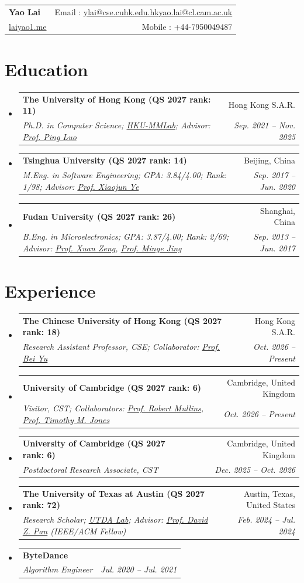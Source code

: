 \documentclass{article}
\makeatletter
\newcommand{\resumeSubheading}[4]{
  \vspace{-1pt}\item
    \begin{tabular*}{0.97\textwidth}{l@{\extracolsep{\fill}}r}
      \textbf{#1} & #2 \\
      \textit{\small#3} & \textit{\small #4} \\
    \end{tabular*}\vspace{-5pt}
}
\newcommand{\resumeSubHeadingListStart}{\begin{itemize}[leftmargin=*]}
\newcommand{\resumeSubHeadingListEnd}{\end{itemize}}
\makeatother
\begin{document}
\begin{tabular*}{\textwidth}{l@{\extracolsep{\fill}}r}
  \textbf{{\Large \textcolor{titlecolor}{Yao Lai}}} & Email : \href{mailto:ylai@cse.cuhk.edu.hk}{ylai@cse.cuhk.edu.hk}\quad\href{mailto:yao.lai@cl.cam.ac.uk}{yao.lai@cl.cam.ac.uk}\\
  \href{https://laiyao1.me/}{laiyao1.me} & Mobile : +44-7950049487 \\
\end{tabular*}

\section{Education}
  \setlength{\itemsep}{0.5pt}
  \setlength{\parsep}{0.5pt}
  \setlength{\parskip}{0.5pt}
  \resumeSubHeadingListStart
    \resumeSubheading
      {The University of Hong Kong (QS 2027 rank: 11)}{Hong Kong S.A.R.}
      {Ph.D. in Computer Science; \href{https://mmlab.hk/}{HKU-MMLab}; Advisor: \href{http://luoping.me/}{Prof. Ping Luo}}{Sep. 2021 -- Nov. 2025}
    \resumeSubheading
      {Tsinghua University (QS 2027 rank: 14)}{Beijing, China}
      {M.Eng. in Software Engineering;  GPA: 3.84/4.00; Rank: 1/98; Advisor: \href{https://www.thss.tsinghua.edu.cn/en/faculty/xiaojunye.htm}{Prof. Xiaojun Ye}}{Sep. 2017 -- Jun. 2020}
    \resumeSubheading
      {Fudan University (QS 2027 rank: 26)}{Shanghai, China}
      {B.Eng. in Microelectronics;  GPA: 3.87/4.00; Rank: 2/69; Advisor: \href{https://sme.fudan.edu.cn/60/77/c31158a352375/page.htm}{Prof. Xuan Zeng}, \href{https://sme.fudan.edu.cn/5f/ec/c31146a352236/page.htm}{Prof. Minge Jing}}{Sep. 2013 -- Jun. 2017}
  \resumeSubHeadingListEnd

\section{Experience}
  \resumeSubHeadingListStart
    \resumeSubheading
      {The Chinese University of Hong Kong (QS 2027 rank: 18)}{Hong Kong S.A.R.}
      {Research Assistant Professor, CSE; Collaborator: \href{https://www.cse.cuhk.edu.hk/~byu/}{Prof. Bei Yu}}{Oct. 2026 -- Present}
    \resumeSubheading
      {University of Cambridge (QS 2027 rank: 6)}{Cambridge, United Kingdom}
      {Visitor, CST; Collaborators: \href{https://www.cl.cam.ac.uk/~rdm34/}{Prof. Robert Mullins}, \href{https://www.cl.cam.ac.uk/~tmj32/}{Prof. Timothy M. Jones}}{Oct. 2026 -- Present}
    \resumeSubheading
      {University of Cambridge (QS 2027 rank: 6)}{Cambridge, United Kingdom}
      {Postdoctoral Research Associate, CST}{Dec. 2025 -- Oct. 2026}
    \resumeSubheading
      {The University of Texas at Austin (QS 2027 rank: 72)}{Austin, Texas, United States}
      {Research Scholar; \href{https://www.cerc.utexas.edu/utda/}{UTDA Lab}; Advisor: \href{https://users.ece.utexas.edu/~dpan/}{Prof. David Z. Pan} (IEEE/ACM Fellow)}{Feb. 2024 -- Jul. 2024}
    \resumeSubheading
      {ByteDance}{}
      {Algorithm Engineer}{Jul. 2020 -- Jul. 2021}
  \resumeSubHeadingListEnd
\end{document}
